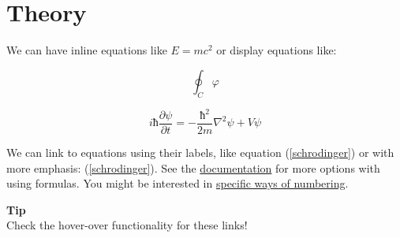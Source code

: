 \section{Theory}

We can have inline equations like $E=mc^2$ or display equations like:

\begin{equation}
∮_C \varphi
\end{equation}

\begin{equation}
\label{schrodinger}
iħ \frac{∂ \psi}{∂ t} = -\frac{ħ^2}{2m}∇^2\psi + V\psi
\end{equation}

We can link to equations using their labels, like equation (\ref{schrodinger}) or with more emphasis: (\ref{schrodinger}). See the \href{https://mystmd.org/guide/math}{documentation} for more options with using formulas. You might be interested in \href{https://mystmd.org/guide/cross-references\#continuous-numbering}{specific ways of numbering}.

\begin{framed}
\textbf{Tip}\\
Check the hover-over functionality for these links!
\end{framed}